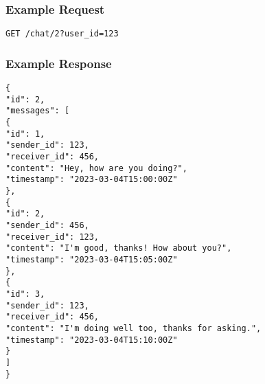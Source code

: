 \documentclass{article}
\begin{document}
\subsubsection{Example Request}

\begin{verbatim}
GET /chat/2?user_id=123
\end{verbatim}

\subsubsection{Example Response}

\begin{verbatim}
{
"id": 2,
"messages": [
{
"id": 1,
"sender_id": 123,
"receiver_id": 456,
"content": "Hey, how are you doing?",
"timestamp": "2023-03-04T15:00:00Z"
},
{
"id": 2,
"sender_id": 456,
"receiver_id": 123,
"content": "I'm good, thanks! How about you?",
"timestamp": "2023-03-04T15:05:00Z"
},
{
"id": 3,
"sender_id": 123,
"receiver_id": 456,
"content": "I'm doing well too, thanks for asking.",
"timestamp": "2023-03-04T15:10:00Z"
}
]
}
\end{verbatim}
\end{document}
